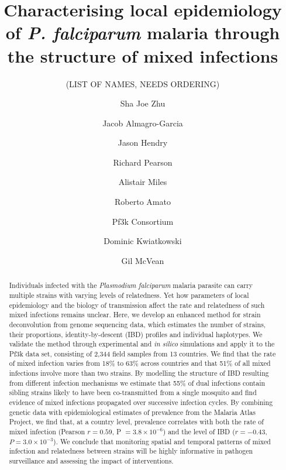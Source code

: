 \documentclass[9pt,lineno]{elife}
\newcounter{todocounter}
\newcommand{\done}[2][]
{\todo[color=green!40, #1]{#2}}
\newcommand{\donenum}[2][]
{\stepcounter{todocounter}\done[#1]{\thetodocounter: #2}}
\begin{document}
\title{Characterising local epidemiology of {\it P. falciparum} malaria through the structure of mixed infections}
\newcommand\shorttitle{Mixed infections in malaria}
\date{}

\author[?]{(LIST OF NAMES, NEEDS ORDERING)}
\author[1]{Sha Joe Zhu}
\author[1,2,3,4]{Jacob Almagro-Garcia}
\author[1]{Jason Hendry}
\author[2,3]{Richard Pearson}
\author[2,3]{Alistair Miles}
\author[2,3]{Roberto Amato}
\author[?]{Pf3k Consortium}
\author[2,3]{Dominic Kwiatkowski}
\author[1,3]{Gil McVean}



\maketitle{}

\begin{abstract}
Individuals infected with the {\it Plasmodium falciparum} malaria parasite can carry multiple strains with varying levels of relatedness. Yet how parameters of local epidemiology and the biology of transmission affect the rate and relatedness of such mixed infections remains unclear.  Here, we develop an enhanced method for strain deconvolution from genome sequencing data, which estimates the number of strains, their proportions, identity-by-descent (IBD) profiles and individual haplotypes.  We validate the method through experimental and {\em in silico} simulations and apply it to the Pf3k data set, consisting of 2,344 field samples from 13 countries.  We find that the rate of mixed infection varies from 18\% to 63\% across countries and that 51\% of all mixed infections involve more than two strains.  By modelling the structure of IBD resulting from different infection mechanisms we estimate that 55\% of dual infections contain sibling strains likely to have been co-transmitted from a single mosquito and find evidence of mixed infections propagated over successive infection cycles.  By combining genetic data with epidemiological estimates of prevalence from the Malaria Atlas Project, we find that, at a country level, prevalence correlates with both the rate of mixed infection (Pearson $r = 0.59$, P $= 3.8 \times 10^{-6}$) and the level of IBD ($r = -0.43$, $P = 3.0 \times 10^{-3}$).  We conclude that monitoring spatial and temporal patterns of mixed infection and relatedness between strains will be highly informative in pathogen surveillance and assessing the impact of interventions.
\end{abstract}
\end{document}
